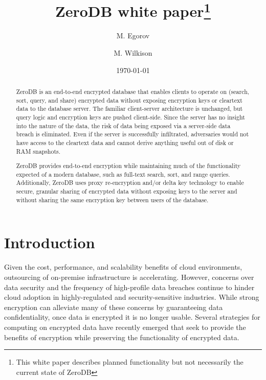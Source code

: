 \documentclass[notitlepage,longbibliography]{revtex4-1}
\begin{document}
\title{ZeroDB white paper\footnote{This white paper describes planned functionality but not necessarily the current state of ZeroDB}}

\author{M. Egorov}
\author{M. Wilkison}

\begin{abstract}
ZeroDB is an end-to-end encrypted database that enables clients to operate on (search, sort, query, and share) encrypted data without exposing encryption keys or cleartext data to the database server.
The familiar client-server architecture is unchanged, but query logic and encryption keys are pushed client-side.
Since the server has no insight into the nature of the data, the risk of data being exposed via a server-side data breach is eliminated.
Even if the server is successfully infiltrated, adversaries would not have access to the cleartext data and
cannot derive anything useful out of disk or RAM snapshots.

ZeroDB provides end-to-end encryption while maintaining much of the functionality expected of a modern database, such as full-text search, sort, and range queries.
Additionally, ZeroDB uses proxy re-encryption and/or delta key technology to enable secure, granular sharing of encrypted data without exposing keys to the server and without sharing the same encryption key between users of the database.
\end{abstract}

\date{\today}
\maketitle

\section{Introduction}

Given the cost, performance, and scalability benefits of cloud environments, outsourcing of on-premise infrastructure is accelerating.
However, concerns over data security and the frequency of high-profile data breaches continue to hinder cloud adoption in highly-regulated and security-sensitive industries.
While strong encryption can alleviate many of these concerns by guaranteeing data confidentiality, once data is encrypted it is no longer usable.
Several strategies for computing on encrypted data have recently emerged that seek to provide the benefits of encryption while preserving the functionality of encrypted data.
\end{document}
